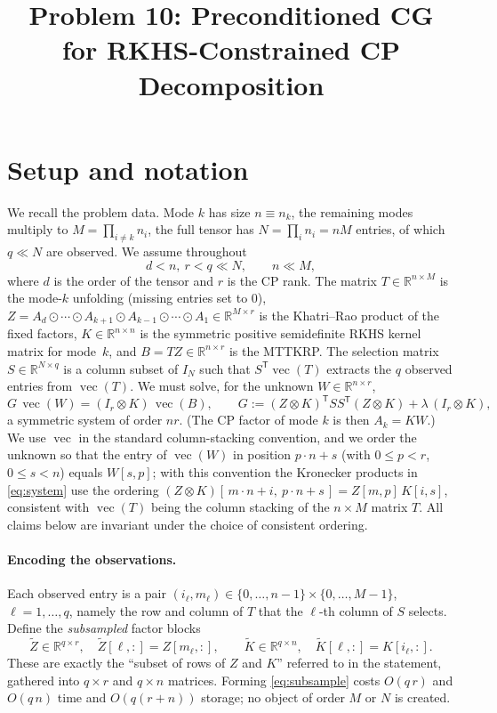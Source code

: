 \documentclass[12pt]{article}
\title{Problem 10: Preconditioned CG for RKHS-Constrained CP Decomposition}
\author{}
\date{}
\DeclareMathOperator{\vecop}{vec}
\newcommand{\bR}{\mathbb{R}}
\newcommand{\KR}{\odot}
\begin{document}
\maketitle

\section{Setup and notation}

We recall the problem data. Mode $k$ has size $n\equiv n_k$, the remaining modes
multiply to $M=\prod_{i\neq k}n_i$, the full tensor has $N=\prod_i n_i = nM$
entries, of which $q\ll N$ are observed. We assume throughout
\[
  d<n,\ r<q\ll N,\qquad n\ll M ,
\]
where $d$ is the order of the tensor and $r$ is the CP rank.
The matrix $T\in\bR^{n\times M}$ is the mode-$k$ unfolding (missing entries
set to $0$), $Z=A_d\KR\cdots\KR A_{k+1}\KR A_{k-1}\KR\cdots\KR A_1\in\bR^{M\times r}$
is the Khatri--Rao product of the fixed factors, $K\in\bR^{n\times n}$ is the
symmetric positive semidefinite RKHS kernel matrix for mode~$k$, and
$B=TZ\in\bR^{n\times r}$ is the MTTKRP. The selection matrix
$S\in\bR^{N\times q}$ is a column subset of $I_N$ such that $S^{\mathsf T}\vecop(T)$
extracts the $q$ observed entries from $\vecop(T)$. We must solve, for the
unknown $W\in\bR^{n\times r}$,
\begin{equation}\label{eq:system}
  G\,\vecop(W) = (I_r\otimes K)\,\vecop(B),
  \qquad
  G := (Z\otimes K)^{\mathsf T}SS^{\mathsf T}(Z\otimes K)+\lambda\,(I_r\otimes K),
\end{equation}
a symmetric system of order $nr$. (The CP factor of mode $k$ is then $A_k=KW$.)
We use $\vecop$ in the standard column-stacking convention, and we order the
unknown so that the entry of $\vecop(W)$ in position $p\cdot n+s$ (with
$0\le p<r$, $0\le s<n$) equals $W[s,p]$; with this convention the Kronecker
products in \eqref{eq:system} use the ordering
$(Z\otimes K)[\,m\cdot n+i,\ p\cdot n+s\,]=Z[m,p]\,K[i,s]$, consistent with
$\vecop(T)$ being the column stacking of the $n\times M$ matrix $T$. All claims
below are invariant under the choice of consistent ordering.

\paragraph{Encoding the observations.}
Each observed entry is a pair $(i_\ell,m_\ell)\in\{0,\dots,n-1\}\times\{0,\dots,M-1\}$,
$\ell=1,\dots,q$, namely the row and column of $T$ that the $\ell$-th column of
$S$ selects. Define the \emph{subsampled} factor blocks
\begin{equation}\label{eq:subsample}
  \tilde Z\in\bR^{q\times r},\quad \tilde Z[\ell,:]=Z[m_\ell,:],
  \qquad
  \tilde K\in\bR^{q\times n},\quad \tilde K[\ell,:]=K[i_\ell,:].
\end{equation}
These are exactly the ``subset of rows of $Z$ and $K$'' referred to in the
statement, gathered into $q\times r$ and $q\times n$ matrices. Forming
\eqref{eq:subsample} costs $O(q\,r)$ and $O(q\,n)$ time and $O(q(r+n))$ storage;
no object of order $M$ or $N$ is created.
\end{document}

